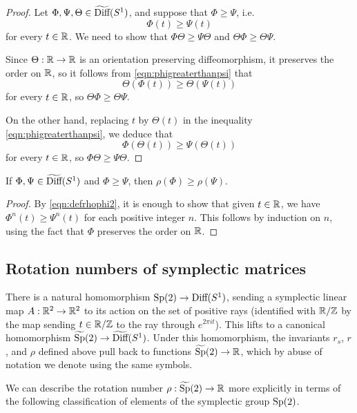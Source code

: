 \begin{proof}
Let $\Phi,\Psi,\Theta \in \widetilde{\text{Diff}}(S^1)$, and suppose that $\Phi\ge\Psi$, i.e.
\begin{equation}
\label{eqn:phigreaterthanpsi}
\Phi(t) \ge \Psi(t)
\end{equation}
for every $t\in{\mathbb R}$. We need to show that $\Phi\Theta\ge \Psi\Theta$ and $\Theta\Phi\ge\Theta\Psi$.

Since $\Theta:{\mathbb R}\to{\mathbb R}$ is an orientation preserving diffeomorphism, it preserves the order on ${\mathbb R}$, so it follows from \eqref{eqn:phigreaterthanpsi} that
\[
\Theta(\Phi(t)) \ge \Theta(\Psi(t))
\]
for every $t\in{\mathbb R}$, so $\Theta\Phi\ge\Theta\Psi$.

On the other hand, replacing $t$ by $\Theta(t)$ in the inequality \eqref{eqn:phigreaterthanpsi}, we deduce that
\[
\Phi(\Theta(t)) \ge \Psi(\Theta(t))
\]
for every $t\in{\mathbb R}$, so $\Phi\Theta\ge\Psi\Theta$.
\end{proof}

\begin{lemma}
\label{lem:rhoorder}
If $\Phi,\Psi\in\widetilde{\text{Diff}}(S^1)$ and $\Phi\ge\Psi$, then $\rho(\Phi)\ge \rho(\Psi)$.
\end{lemma}

\begin{proof}
By \eqref{eqn:defrhophi2}, it is enough to show that given $t\in{\mathbb R}$, we have $\Phi^n(t)\ge \Psi^n(t)$ for each positive integer $n$. This follows by induction on $n$, using the fact that $\Phi$ preserves the order on ${\mathbb R}$.
\end{proof}

\subsection{Rotation numbers of symplectic matrices}
\label{subsubsec:the_symplectic_rotation_number}

There is a natural homomorphism $\text{Sp}(2)\to\text{Diff}(S^1)$, sending a symplectic linear map $A:{\mathbb R}^2\to{\mathbb R}^2$ to its action on the set of positive rays (identified with ${\mathbb R}/{\mathbb Z}$ by the map sending $t\in{\mathbb R}/{\mathbb Z}$ to the ray through $e^{2\pi i t}$). This lifts to a canonical homomorphism $\widetilde{\text{Sp}}(2)\to\widetilde{\text{Diff}}(S^1)$. Under this homomorphism, the invariants $r_s$, $r$, and $\rho$ defined above pull back to functions $\widetilde{\text{Sp}}(2)\to{\mathbb R}$, which by abuse of notation we denote using the same symbols.

We can describe the rotation number $\rho:\widetilde{\text{Sp}}(2)\to{\mathbb R}$ more explicitly in terms of the following classification of elements of the symplectic group $\text{Sp}(2)$.

